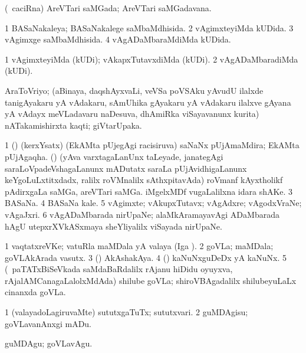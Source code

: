 \bentry
{}
\gl{\gu}
\bmng
(\roVkAyx\ caciRna) AreVTari saMGada; AreVTari saMGadavana. 
\emng
\eentry

\bentry
{}
\gl{\gu}
\bmng
\bnum
\num{1} BASaNakaleya; BASaNakalege saMbaMdhisida. 
\num{2} vAgimxteyiMda kUDida. 
\num{3} vAgimxge saMbaMdhisida. 
\num{4} vAgADaMbaraMdiMda kUDida. 
\enum
\emng
\eentry

\bentry
{}
\gl{\kirxvi}
\bmng
\bnum
\num{1} vAgimxteyiMda (kUDi); vAkapxTutavxdiMda (kUDi). 
\num{2} vAgADaMbaradiMda (kUDi). 
\enum
\emng
\eentry

\bentry
{}
\gl{\nA}
\bmng
AraToVriyo; (aBinaya, daqshAyxvaLi, veVSa poVSAku yAvudU ilalxde tanigAyakaru yA vAdakaru, sAmUhika gAyakaru yA vAdakaru ilalxve gAyana yA vAdayx meVLadavaru naDesuva, dhAmiRka viSayavanunx kurita) nATakamishirxta kaqti; giVtarUpaka. 
\emng
\eentry

\bentry
{}
\gl{\nA}
\bmng
\bnum
\num{1} () (kerxYsatx) (EkAMta pUjegAgi racisiruva) saNaNx pUjAmaMdira; EkAMta pUjAgaqha. 
 () 
\banum
{} (yAva varxtagaLanUnx taLeyade, janategAgi saraLoVpadeVshagaLanunx mADutatx saraLa pUjAvidhigaLanunx keYgoLuLxtitxdadx, ralilx roVMnalilx sAthxpitavAda) roVmanf kAyxtholikf pAdirxgaLa saMGa, areVTari saMGa. 
 iMgelxMDf \mo vugaLalilxna idara shAKe. 
\eanum
\numie
\num{3} BASaNa. 
\num{4} BASaNa kale. 
\num{5} vAgimxte; vAkupxTutavx; vAgAdxre; vAgodxVraNe; vAgaJxri. 
\num{6} vAgADaMbarada nirUpaNe; alaMkAramayavAgi ADaMbarada hAgU utepxrXVkASxmaya sheYliyalilx viSayada nirUpaNe. 
\enum
\emng
\eentry

\bentry
{}
\gl{\nA}
\bmng
\bnum
\num{1} vaqtatxreVKe; vatuRla maMDala yA valaya (Iga \viparx). 
\num{2} goVLa; maMDala; goVLAkArada vasutx. 
\num{3} (\kAparx) AkAshakAya. 
\num{4} (\kAparx) kaNuNxguDeDx yA kaNuNx. 
\num{5} (\kanmu\ paTATxBiSeVkada saMdaBaRdalilx rAjanu hiDidu oyuyxva, rAjalAMCanagaLalolxMdAda) shilube goVLa; shiroVBAgadalilx shilubeyuLaLx cinanxda goVLa. 
\enum
\emng
\eentry

\bentry
{}
\gl{\sakirx}
\bmng
\bnum
\num{1} (valayadoLagiruvaMte) sututxgaTuTx; sututxvari. 
\num{2} guMDAgisu; goVLavanAnxgi mADu. 
\enum
\emng

\noindent
\gl{\akirx}
\bmng
guMDAgu; goVLavAgu. 
\emng
\eentry

